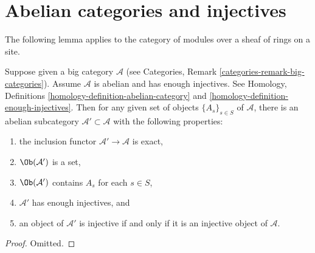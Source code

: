 \section{Abelian categories and injectives}
\label{section-abelian-categories-injectives}

\noindent
The following lemma applies to the category of modules over a sheaf
of rings on a site.

\begin{lemma}
\label{lemma-abelian-injectives}
Suppose given a big category $\mathcal{A}$ (see
Categories, Remark \ref{categories-remark-big-categories}).
Assume $\mathcal{A}$ is abelian and has enough injectives.
See Homology, Definitions \ref{homology-definition-abelian-category}
and \ref{homology-definition-enough-injectives}.
Then for any given set of objects $\{A_s\}_{s\in S}$
of $\mathcal{A}$, there is an abelian subcategory
$\mathcal{A}' \subset \mathcal{A}$
with the following properties:
\begin{enumerate}
\item the inclusion functor $\mathcal{A}' \to \mathcal{A}$ is exact,
\item $\Ob(\mathcal{A}')$ is a set,
\item $\Ob(\mathcal{A}')$ contains $A_s$ for each $s \in S$,
\item $\mathcal{A}'$ has enough injectives, and
\item an object of $\mathcal{A}'$ is injective if and only if it
is an injective object of $\mathcal{A}$.
\end{enumerate}
\end{lemma}

\begin{proof}
Omitted.
\end{proof}















